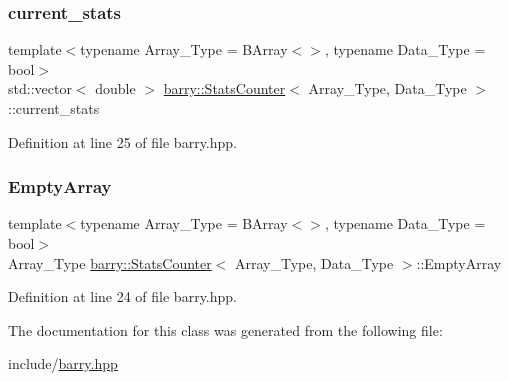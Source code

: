 \subsubsection{\texorpdfstring{current\+\_\+stats}{current\_stats}}
{\footnotesize\ttfamily template$<$typename Array\+\_\+\+Type  = B\+Array$<$$>$, typename Data\+\_\+\+Type  = bool$>$ \\
std\+::vector$<$ double $>$ \hyperlink{classbarry_1_1_stats_counter}{barry\+::\+Stats\+Counter}$<$ Array\+\_\+\+Type, Data\+\_\+\+Type $>$\+::current\+\_\+stats}



Definition at line 25 of file barry.\+hpp.

\mbox{\label{classbarry_1_1_stats_counter_ad78463fadfa385a69121c40fdc8fd193}} 
\subsubsection{\texorpdfstring{Empty\+Array}{EmptyArray}}
{\footnotesize\ttfamily template$<$typename Array\+\_\+\+Type  = B\+Array$<$$>$, typename Data\+\_\+\+Type  = bool$>$ \\
Array\+\_\+\+Type \hyperlink{classbarry_1_1_stats_counter}{barry\+::\+Stats\+Counter}$<$ Array\+\_\+\+Type, Data\+\_\+\+Type $>$\+::Empty\+Array}



Definition at line 24 of file barry.\+hpp.



The documentation for this class was generated from the following file\+:\begin{DoxyCompactItemize}
\item 
include/\hyperlink{barry_8hpp}{barry.\+hpp}\end{DoxyCompactItemize}
